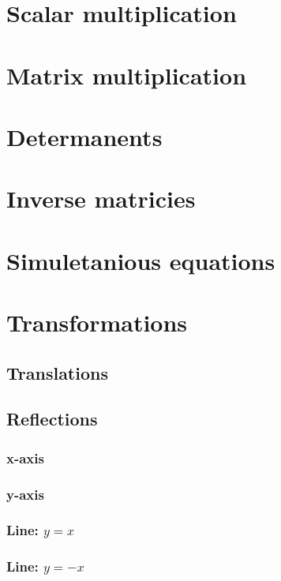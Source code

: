 \documentclass{book}
\begin{document}
\section{Scalar multiplication}

\section{Matrix multiplication}

\section{Determanents}

\section{Inverse matricies}

\section{Simuletanious equations}

\section{Transformations}
\subsection{Translations}

\subsection{Reflections}
\subsubsection{x-axis}

\subsubsection{y-axis}

\subsubsection{Line: $y = x$}

\subsubsection{Line: $y = -x$}
\end{document}
